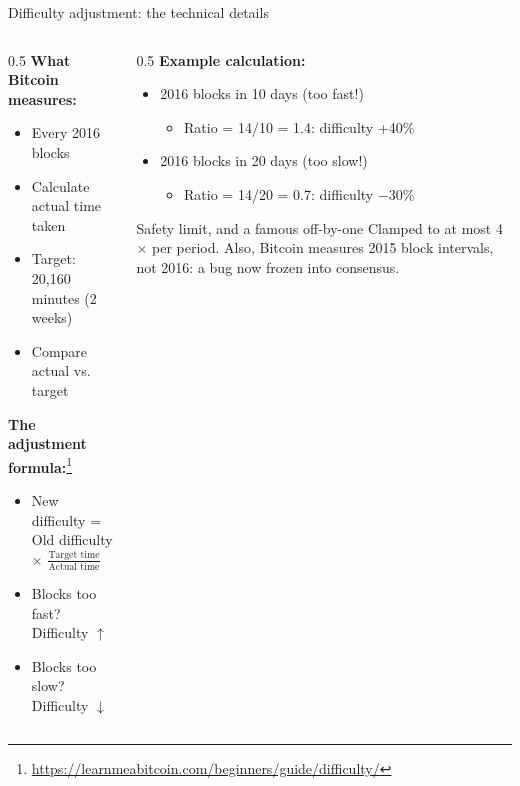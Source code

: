 \ifdefined\PRESENTATION\else\PassOptionsToClass{handout}{beamer}\fi\documentclass[aspectratio=169, lualatex]{beamer}
\begin{document}
\begin{frame}{Difficulty adjustment: the technical details}
	\begin{columns}[c]
		\begin{column}{0.5\textwidth}
			\textbf{What Bitcoin measures:}
			\begin{itemize}
				\item Every 2016 blocks
				\item Calculate actual time taken
				\item Target: 20,160 minutes (2 weeks)
				\item Compare actual vs. target
			\end{itemize}
			\textbf{The adjustment formula:}\footnote{\url{https://learnmeabitcoin.com/beginners/guide/difficulty/}}
			\begin{itemize}
				\item New difficulty = Old difficulty $\times$ $\frac{\text{Target time}}{\text{Actual time}}$
				\item Blocks too fast? Difficulty $\uparrow$
				\item Blocks too slow? Difficulty $\downarrow$
			\end{itemize}
		\end{column}
		\begin{column}{0.5\textwidth}
			\textbf{Example calculation:}
			\begin{itemize}
				\item 2016 blocks in 10 days (too fast!)
				      \begin{itemize}
					      \item Ratio = 14/10 = 1.4: difficulty +40\%
				      \end{itemize}
				\item 2016 blocks in 20 days (too slow!)
				      \begin{itemize}
					      \item Ratio = 14/20 = 0.7: difficulty $-$30\%
				      \end{itemize}
			\end{itemize}
			\begin{alertblock}{Safety limit, and a famous off-by-one}
				Clamped to at most 4$\times$ per period. Also, Bitcoin measures 2015 block intervals, not 2016: a bug now frozen into consensus.
			\end{alertblock}
		\end{column}
	\end{columns}
\end{frame}
\end{document}
